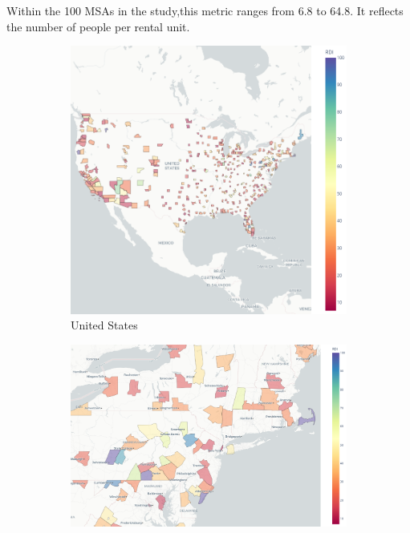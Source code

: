 \documentclass[APA,Times1COL]{WileyNJDv5} %
\begin{document}
Within the 100 MSAs in the study,this metric ranges from 6.8 to 64.8. It reflects the number of people per rental unit. 
\begin{figure}[hbt!]
	\centering
	
	\begin{subfigure}[b]{0.32\textwidth}
		\includegraphics[width=\linewidth]{us.png}
		\caption{United States}\label{fig:us_choropleth}
	\end{subfigure}\hfill
	\begin{subfigure}[b]{0.32\textwidth}
		\includegraphics[width=\linewidth]{tristate.png}

\end{subfigure}
\end{figure}
\end{document}
